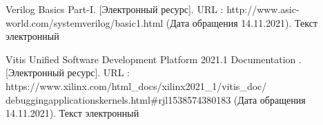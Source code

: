 
\begin{thebibliography}{1}

	 Verilog Basics Part-I. [Электронный ресурс]. URL : http://www.asic-world.com/systemverilog/basic1.html (Дата обращения 14.11.2021). Текст электронный
	
	 Vitis Unified Software Development Platform 2021.1 Documentation . [Электронный ресурс]. URL : https://www.xilinx.com/html\_docs/xilinx2021\_1/vitis\_doc/ debuggingapplicationskernels.html\#rjl1538574380183 (Дата обращения 14.11.2021). Текст электронный

\end{thebibliography}
